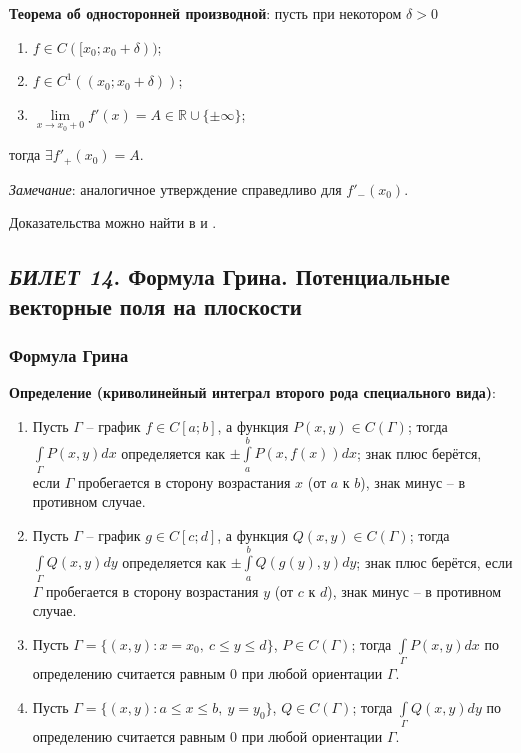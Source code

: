 \documentclass[12pt, a4paper, reqno]{article}
\begin{document}
    \textbf{Теорема об односторонней производной}: пусть при некотором $\delta > 0$
    \begin{enumerate}
        \item $f \in C([x_0; x_0 + \delta))$;
        \item $f \in C^1((x_0; x_0 + \delta))$;
        \item $\lim\limits_{x \to x_0 + 0} f'(x) = A \in \mathbb{R} \cup \{\pm\infty\}$;
    \end{enumerate}
    тогда $\exists f'_{+}(x_0) = A$.

    \textit{Замечание}: аналогичное утверждение справедливо для $f'_{-}(x_0)$.

    Доказательства можно найти в \cite{petrovich-1} и \cite{petrovich-3}.

\newpage
\subsection{\textit{БИЛЕТ 14}. Формула Грина. Потенциальные векторные поля на плоскости}

    \subsubsection{Формула Грина}

    \textbf{Определение (криволинейный интеграл второго рода специального вида)}:
    \begin{enumerate}
        \item Пусть $\Gamma$ -- график $f \in C[a; b]$, а функция $P(x, y) \in C(\Gamma)$; тогда
              $\int\limits_{\Gamma} P(x, y)dx$ определяется как $\pm \int\limits_{a}^{b} P(x, f(x))dx$;
              знак плюс берётся, если $\Gamma$ пробегается в сторону возрастания $x$ (от $a$ к $b$),
              знак минус -- в противном случае.
        \item Пусть $\Gamma$ -- график $g \in C[c; d]$, а функция $Q(x, y) \in C(\Gamma)$; тогда
              $\int\limits_{\Gamma} Q(x, y)dy$ определяется как $\pm \int\limits_{a}^{b} Q(g(y), y)dy$;
              знак плюс берётся, если $\Gamma$ пробегается в сторону возрастания $y$ (от $c$ к $d$),
              знак минус -- в противном случае.
        \item Пусть $\Gamma = \{(x, y): x = x_0,\ c \leq y \leq d\}$, $P \in C(\Gamma)$; тогда
              $\int\limits_{\Gamma} P(x, y)dx$ по определению считается равным 0 при любой ориентации
              $\Gamma$.
        \item Пусть $\Gamma = \{(x, y): a \leq x \leq b,\ y = y_0\}$, $Q \in C(\Gamma)$; тогда
              $\int\limits_{\Gamma} Q(x, y)dy$ по определению считается равным 0 при любой ориентации
              $\Gamma$.
    \end{enumerate}
\end{document}
